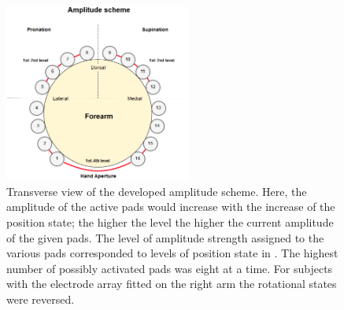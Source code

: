 \begin{figure}[H]                 
	\includegraphics[width=0.55\textwidth]{figures/El_array_amplitude}  
	\caption{Transverse view of the developed amplitude scheme. Here, the amplitude of the active pads would increase with the increase of the position state; the higher the level the higher the current amplitude of the given pads. The level of amplitude strength assigned to the various pads corresponded to levels of position state in . The highest number of possibly activated pads was eight at a time.  For subjects with the electrode array fitted on the right arm the rotational states were reversed.}
	\label{fig:amplitude} 
\end{figure}






